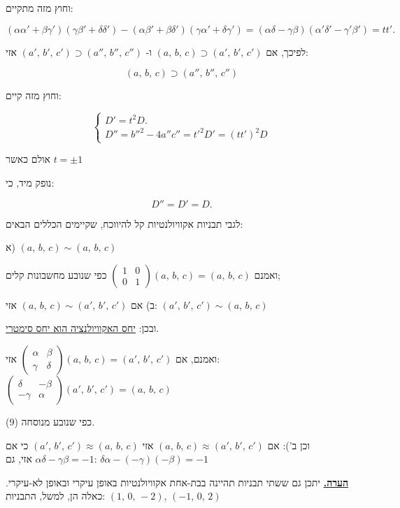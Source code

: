 וחוץ מזה מתקיים:

\[
(\alpha\alpha'+\beta\gamma')(\gamma\beta'+\delta\delta') - (\alpha\beta'+\beta\delta')(\gamma\alpha'+\delta\gamma') = (\alpha\delta-\gamma\beta)(\alpha'\delta'-\gamma'\beta') = tt' . \tag{17}
\]

לפיכך, אם $(a,\,b,\,c) \supset (a',\,b',\,c')$ ו- $(a',\,b',\,c') \supset (a'',\,b'',\,c'')$ אזי:

\[ (a,\,b,\,c) \supset (a'',\,b'',\,c'') \]

וחוץ מזה קיים:

\[
\begin{cases}
D' = t^2 D. \\
D'' = b''^2 - 4a''c'' = t'^2 D' = (tt')^2 D
\end{cases}
\tag{18}
\]

אולם כאשר $t = \pm 1$

נופק מיד, כי:

\[ D'' = D' = D. \tag{19} \]

לגבי תבניות אקוויולנטיות קל להיווכח, שקיימים הכללים הבאים:

\medskip
\noindent א) $(a,\,b,\,c) \sim (a,\,b,\,c)$

ואמנם $\begin{pmatrix}1 & 0\\ 0 & 1\end{pmatrix}(a,\,b,\,c) = (a,\,b,\,c)$ כפי שנובע מחשבונות קלים;

\medskip
\noindent ב) אם $(a,\,b,\,c) \sim (a',\,b',\,c')$ אזי: $(a',\,b',\,c') \sim (a,\,b,\,c)$

ובכן: \underline{יחס האקוויולנציה הוא יחס סימטרי}.

\medskip
ואמנם, אם $\begin{pmatrix}\alpha & \beta\\ \gamma & \delta\end{pmatrix}(a,\,b,\,c) = (a',\,b',\,c')$ אזי: $\begin{pmatrix}\delta & -\beta\\ -\gamma & \alpha\end{pmatrix}(a',\,b',\,c') = (a,\,b,\,c)$

כפי שנובע מנוסחה (9).

\medskip
וכן ב'): אם $(a,\,b,\,c) \approx (a',\,b',\,c')$ אזי $(a',\,b',\,c') \approx (a,\,b,\,c)$ כי אם $\alpha\delta - \gamma\beta = -1$ אזי, גם: $\delta\alpha - (-\gamma)(-\beta) = -1$

\medskip
\noindent\textbf{\underline{הערה.}} יתכן גם ששתי תבניות תהיינה בבת-אחת אקוויולנטיות באופן עיקרי ובאופן לא-עיקרי. כאלה הן, למשל, התבניות: $(1,\,0,\,-2)$, $(-1,\,0,\,2)$

